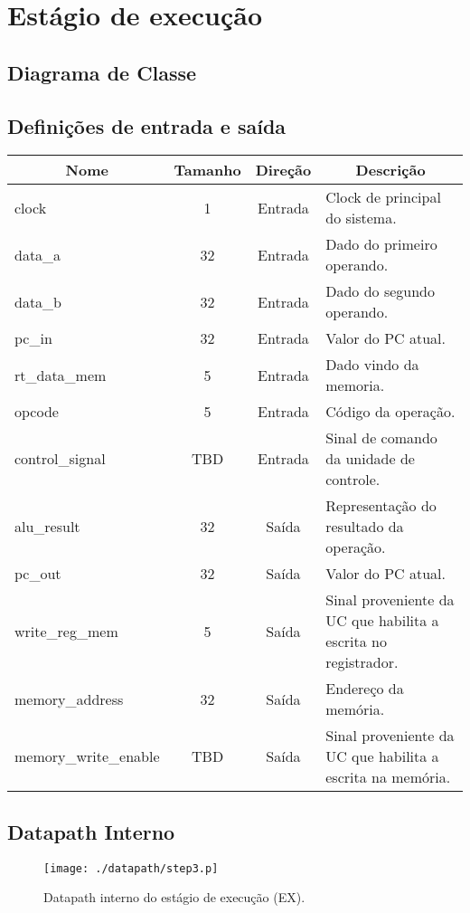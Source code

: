 \section{Estágio de execução}
	\subsection{Diagrama de Classe}
  \begin{figure}[h]
    
  \end{figure}
		
		\subsection{Definições de entrada e saída}
		
	\begin{center}
		\begin{longtable}[pos]{| l | c | c | m{7cm} |} \hline
			\multicolumn{1}{|c|}{\cellcolor[gray]{0.9}\textbf{Nome}} & 
			\multicolumn{1}{c|}{\cellcolor[gray]{0.9}\textbf{Tamanho}} & 
			\multicolumn{1}{c|}{\cellcolor[gray]{0.9}\textbf{Direção}} &
			\multicolumn{1}{c|}{\cellcolor[gray]{0.9}\textbf{Descrição}} \\ \hline
			\endhead
			\hline
			\endlastfoot
			
			clock & 1 & Entrada & Clock de principal do sistema.\\ \hline
			data_a & 32 & Entrada & Dado do primeiro operando. \\ \hline
			data_b & 32 & Entrada & Dado do segundo operando. \\ \hline
			pc_in & 32 & Entrada & Valor do PC atual. \\ \hline
			rt_data_mem & 5 & Entrada & Dado vindo da memoria. \\ \hline
			opcode & 5 & Entrada & Código da operação.\\ \hline
			control_signal & TBD & Entrada & Sinal de comando da unidade de controle. \\ \hline
			alu_result & 32 & Saída & Representação do resultado da operação. \\ \hline
			pc_out & 32 & Saída & Valor do PC atual. \\ \hline
			write_reg_mem & 5 & Saída & Sinal proveniente da UC que habilita a escrita no registrador. \\ \hline
			memory_address & 32 & Saída & Endereço da memória. \\ \hline
			memory_write_enable & TBD & Saída & Sinal proveniente da UC que habilita a escrita na memória.
			
		\end{longtable}
	\end{center}
	
	\subsection{Datapath Interno}
	
	\begin{figure}[ht]
		\begin{center}
		\texttt{[image: ./datapath/step3.p]}
		\caption*{Datapath interno do estágio de execução (EX).}
		\end{center}
	\end{figure}